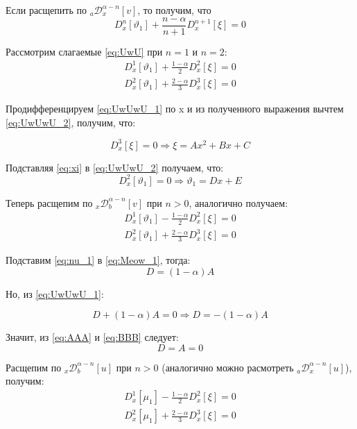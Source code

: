 \documentclass[a4paper, fontsize=14pt]{article}
\newcommand{\D}[3]{D_{#1}^{#2} \left[ #3 \right]} %
\newcommand{\RLDa}[4]{{}_{#1}\mathcal{D}_{#2}^{#4} \left[#3\right]} %
\begin{document}
Если расщепить по $\RLDa{a}{x}{v}{\alpha - n}$, то получим, что 
\begin{equation}
  \label{eq:UwU}
  \D{x}{n}{\vartheta _1} + \frac{n - \alpha}{n + 1} \D{x}{n+1}{\xi}  = 0
\end{equation}

Рассмотрим слагаемые \eqref{eq:UwU} при $n = 1$ и $n = 2$:
\begin{gather}
  \label{eq:UwUwU_1}\D{x}{1}{\vartheta _1} + \frac{1 - \alpha}{2} \D{x}{2}{\xi} = 0 \\
  \label{eq:UwUwU_2}\D{x}{2}{\vartheta _1} + \frac{2 - \alpha}{3} \D{x}{3}{\xi} = 0
\end{gather}

Продифференцируем \eqref{eq:UwUwU_1} по x и из полученного выражения вычтем \eqref{eq:UwUwU_2}, получим, что:

\begin{equation}
  \label{eq:xi}
  \D{x}{3}{\xi} = 0 \Rightarrow \xi = A x^2 + B x + C
\end{equation}

Подставляя \eqref{eq:xi} в \eqref{eq:UwUwU_2} получаем, что:
\begin{equation}
  \label{eq:nu_1}
  \D{x}{2}{\vartheta _1} = 0 \Rightarrow \vartheta _1 = D x + E
\end{equation}

Теперь расщепим по $\RLDa{x}{b}{v}{\alpha - n}$ при $n > 0$, аналогично получаем:
\begin{gather}
  \label{eq:Meow_1}\D{x}{1}{\vartheta _1} - \frac{1 - \alpha}{2} \D{x}{2}{\xi} = 0 \\
  \label{eq:Meow_2}\D{x}{2}{\vartheta _1} + \frac{2 - \alpha}{3} \D{x}{3}{\xi} = 0
\end{gather}

Подставим \eqref{eq:nu_1} в \eqref{eq:Meow_1}, тогда: 
\begin{equation}
  \label{eq:AAA}
  D = (1 - \alpha) A
\end{equation}

Но, из \eqref{eq:UwUwU_1}:

\begin{equation}
  \label{eq:BBB}
  D + (1 - \alpha) A = 0 \Rightarrow D = - (1 - \alpha) A
\end{equation}

Значит, из \eqref{eq:AAA} и \eqref{eq:BBB} следует:
\begin{equation*}
  D = A = 0
\end{equation*}

Расщепим по $\RLDa{x}{b}{u}{\alpha - n}$ при $n > 0$ (аналогично можно расмотреть $\RLDa{a}{x}{u}{\alpha - n}$), получим:
\begin{gather*}
  \label{eq:Gav_1}\D{x}{1}{\mu_1} - \frac{1 - \alpha}{2} \D{x}{2}{\xi} = 0 \\
  \label{eq:Gav_2}\D{x}{2}{\mu_1} + \frac{2 - \alpha}{3} \D{x}{3}{\xi} = 0
\end{gather*}
\end{document}
